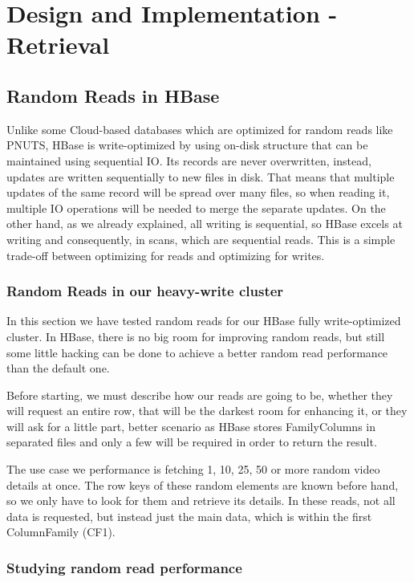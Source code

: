 \chapter{Design and Implementation - Retrieval}
\label{chapter:Design and Implementation - Retrieval}

\section{Random Reads in HBase}

Unlike some Cloud-based databases which are optimized for random reads like PNUTS, HBase is write-optimized by using on-disk structure that can be maintained using sequential IO. Its records are never overwritten, instead, updates are written sequentially to new files in disk. That means that multiple updates of the same record will be spread over many files, so when reading it, multiple IO operations will be needed to merge the separate updates. On the other hand, as we already explained, all writing is sequential, so HBase excels at writing and consequently, in scans, which are sequential reads. This is a simple trade-off between optimizing for reads and optimizing for writes.

\subsection{Random Reads in our heavy-write cluster}

In this section we have tested random reads for our HBase fully write-optimized cluster. In HBase, there is no big room for improving random reads, but still some little hacking can be done to achieve a better random read performance than the default one.
\par
Before starting, we must describe how our reads are going to be, whether they will request an entire row, that will be the darkest room for enhancing it, or they will ask for a little part, better scenario as HBase stores FamilyColumns in separated files and only a few will be required in order to return the result. 
\par
The use case we performance is fetching 1, 10, 25, 50 or more random video details at once. The row keys of these random elements are known before hand, so we only have to look for them and retrieve its details. In these reads, not all data is requested, but instead just the main data, which is within the first ColumnFamily (CF1).                  

\subsection{Studying random read performance}

